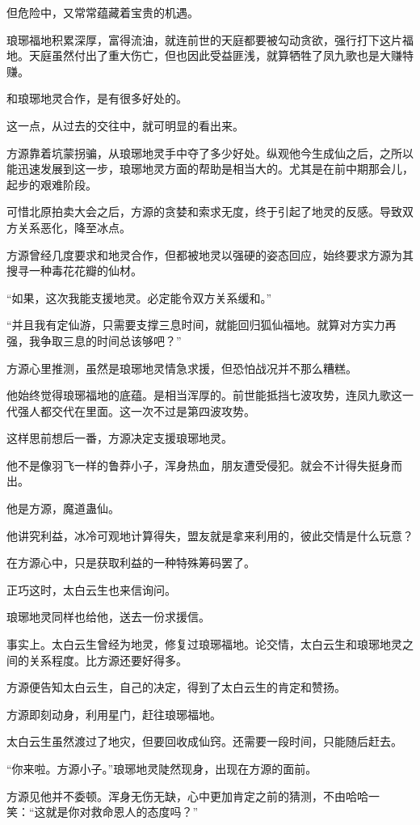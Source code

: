 \begin{this_body}
但危险中，又常常蕴藏着宝贵的机遇。

琅琊福地积累深厚，富得流油，就连前世的天庭都要被勾动贪欲，强行打下这片福地。天庭虽然付出了重大伤亡，但也因此受益匪浅，就算牺牲了凤九歌也是大赚特赚。

和琅琊地灵合作，是有很多好处的。

这一点，从过去的交往中，就可明显的看出来。

方源靠着坑蒙拐骗，从琅琊地灵手中夺了多少好处。纵观他今生成仙之后，之所以能迅速发展到这一步，琅琊地灵方面的帮助是相当大的。尤其是在前中期那会儿，起步的艰难阶段。

可惜北原拍卖大会之后，方源的贪婪和索求无度，终于引起了地灵的反感。导致双方关系恶化，降至冰点。

方源曾经几度要求和地灵合作，但都被地灵以强硬的姿态回应，始终要求方源为其搜寻一种毒花花瓣的仙材。

“如果，这次我能支援地灵。必定能令双方关系缓和。”

“并且我有定仙游，只需要支撑三息时间，就能回归狐仙福地。就算对方实力再强，我争取三息的时间总该够吧？”

方源心里推测，虽然是琅琊地灵情急求援，但恐怕战况并不那么糟糕。

他始终觉得琅琊福地的底蕴。是相当浑厚的。前世能抵挡七波攻势，连凤九歌这一代强人都交代在里面。这一次不过是第四波攻势。

这样思前想后一番，方源决定支援琅琊地灵。

他不是像羽飞一样的鲁莽小子，浑身热血，朋友遭受侵犯。就会不计得失挺身而出。

他是方源，魔道蛊仙。

他讲究利益，冰冷可观地计算得失，盟友就是拿来利用的，彼此交情是什么玩意？

在方源心中，只是获取利益的一种特殊筹码罢了。

正巧这时，太白云生也来信询问。

琅琊地灵同样也给他，送去一份求援信。

事实上。太白云生曾经为地灵，修复过琅琊福地。论交情，太白云生和琅琊地灵之间的关系程度。比方源还要好得多。

方源便告知太白云生，自己的决定，得到了太白云生的肯定和赞扬。

方源即刻动身，利用星门，赶往琅琊福地。

太白云生虽然渡过了地灾，但要回收成仙窍。还需要一段时间，只能随后赶去。

“你来啦。方源小子。”琅琊地灵陡然现身，出现在方源的面前。

方源见他并不委顿。浑身无伤无缺，心中更加肯定之前的猜测，不由哈哈一笑：“这就是你对救命恩人的态度吗？”


\end{this_body}
